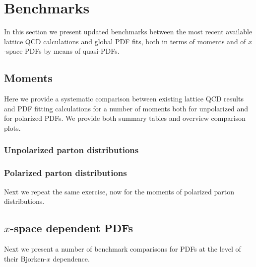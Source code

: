 \section{Benchmarks}

In this section we present updated benchmarks between the most
recent available lattice QCD calculations and global PDF fits,
both in terms of moments and of $x$-space PDFs by means of
quasi-PDFs.

\subsection{Moments}

Here we provide a systematic comparison between existing
lattice QCD results and PDF fitting calculations
for a number of moments both for unpolarized
and for polarized PDFs.
%
We provide both summary tables and overview comparison plots.

\subsubsection{Unpolarized parton distributions}


\subsubsection{Polarized parton distributions}

Next we repeat the same exercise, now for the moments
of polarized parton distributions.


\subsection{$x$-space dependent PDFs}

Next we present a number of benchmark comparisons for
PDFs at the level of their Bjorken-$x$
dependence.
